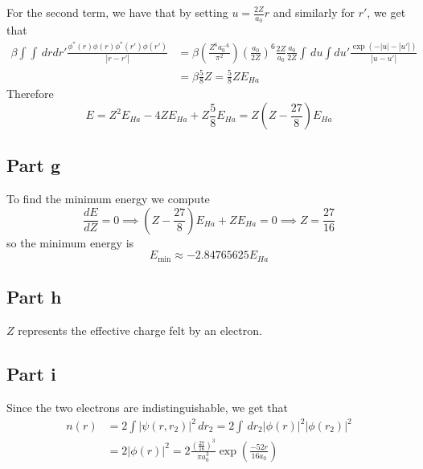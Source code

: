 \documentclass[12pt]{report}
\theoremstyle{custom}
\begin{document}
For the second term, we have that by setting $u = \frac{2Z}{a_0} r$ and similarly for $r'$, we get that
\begin{align*}
    \beta \int\int \, dr dr' \frac{\phi^*(r)\phi(r)\phi^*(r')\phi(r')}{|r - r'|} &= \beta \left(\frac{Z^6a_0^{-6}}{\pi^2}\right)\left(\frac{a_0}{2Z}\right)^6 \frac{2Z}{a_0} \frac{a_0}{2Z} \int \, du \int du' \frac{\exp(-|u| - |u'|)}{|u-u'|} \\
    &= \beta \frac{5}{8}Z = \frac{5}{8}Z E_{Ha}
\end{align*}
Therefore 
\begin{equation*}
    E = Z^2E_{Ha} - 4ZE_{Ha} +Z\frac{5}{8}E_{Ha} = Z\left(Z - \frac{27}{8}\right)E_{Ha}
\end{equation*}
\subsection*{Part g}
To find the minimum energy we compute
\begin{equation*}
    \frac{dE}{dZ} = 0  \implies \left(Z - \frac{27}{8}\right)E_{Ha} + ZE_{Ha} = 0 \implies Z = \frac{27}{16}
\end{equation*}
so the minimum energy is
\begin{equation*}
    E_{\text{min}} \approx -2.84765625 E_{Ha}
\end{equation*}

\subsection*{Part h}
$Z$ represents the effective charge felt by an electron.

\subsection*{Part i}
Since the two electrons are indistinguishable, we get that
\begin{align*}
    n(r) &= 2\int |\psi(r,r_2)|^2 \, dr_2 =2 \int \, dr_2 |\phi(r)|^2 |\phi(r_2)|^2 \\
    &=  2|\phi(r)|^2 =  2 \frac{\left(\frac{27}{16}\right)^3}{\pi a_0^3} \exp\left(\frac{-52r}{16a_0}\right)
\end{align*}
\end{document}
